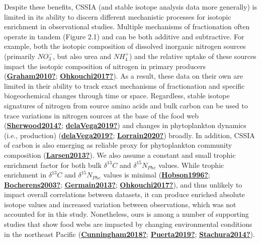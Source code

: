 \documentclass [11pt, proquest] {uwthesis}[2015/03/03]
\begin{document}
Despite these benefits, CSSIA (and stable isotope analysis data more generally) is limited in its ability to discern different mechanistic processes for isotopic enrichment in observational studies. Multiple mechanisms of fractionation often operate in tandem (Figure 2.1) and can be both additive and subtractive. For example, both the isotopic composition of dissolved inorganic nitrogen sources (primarily \(NO_3^-\), but also urea and \(NH_4^+\)) and the relative uptake of these sources impact the isotopic composition of nitrogen in primary producers (\protect\hyperlink{ref-Graham2010}{\textbf{Graham2010?}}; \protect\hyperlink{ref-Ohkouchi2017}{\textbf{Ohkouchi2017?}}). As a result, these data on their own are limited in their ability to track exact mechanisms of fractionation and specific biogeochemical changes through time or space. Regardless, stable isotope signatures of nitrogen from source amino acids and bulk carbon can be used to trace variations in nitrogen sources at the base of the food web (\protect\hyperlink{ref-Sherwood2014}{\textbf{Sherwood2014?}}; \protect\hyperlink{ref-delaVega2019}{\textbf{delaVega2019?}}) and changes in phytoplankton dynamics (i.e., production) (\protect\hyperlink{ref-delaVega2019}{\textbf{delaVega2019?}}; \protect\hyperlink{ref-Lorrain2020}{\textbf{Lorrain2020?}}) broadly. In addition, CSSIA of carbon is also emerging as reliable proxy for phytoplankton community composition (\protect\hyperlink{ref-Larsen2013}{\textbf{Larsen2013?}}). We also assume a constant and small trophic enrichment factor for both bulk \(\delta^{13}C\) and \(\delta^{15}N_{Phe}\) values. While trophic enrichment in \(\delta^{13}C\) and \(\delta^{15}N_{Phe}\) values is minimal (\protect\hyperlink{ref-Hobson1996}{\textbf{Hobson1996?}}; \protect\hyperlink{ref-Bocherens2003}{\textbf{Bocherens2003?}}; \protect\hyperlink{ref-Germain2013}{\textbf{Germain2013?}}; \protect\hyperlink{ref-Ohkouchi2017}{\textbf{Ohkouchi2017?}}), and thus unlikely to impact overall correlations between datasets, it can produce enriched absolute isotope values and increased variation between observations, which was not accounted for in this study. Nonetheless, ours is among a number of supporting studies that show food webs are impacted by changing environmental conditions in the northeast Pacific (\protect\hyperlink{ref-Cunningham2018}{\textbf{Cunningham2018?}}; \protect\hyperlink{ref-Puerta2019}{\textbf{Puerta2019?}}; \protect\hyperlink{ref-Stachura2014}{\textbf{Stachura2014?}}).
\end{document}
